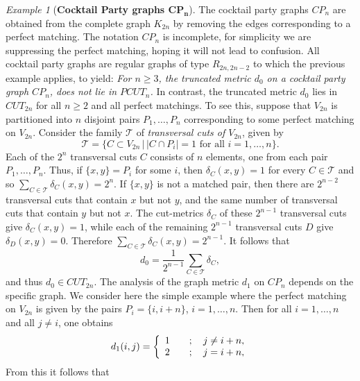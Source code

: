 \documentclass[12pt]{amsart}
\numberwithin{theorem}{section}
\theoremstyle{remark}
\newtheorem{example}[theorem]{Example}
\begin{document}
\begin{example}[{\bf Cocktail Party graphs $\mathbf{CP_n}$}]
The cocktail party graphs $CP_n$ are obtained from the complete graph $K_{2n}$ by removing the edges corresponding to a perfect matching. The notation $CP_n$ is incomplete, for simplicity we are suppressing the perfect matching, hoping it will not lead to confusion. All cocktail party graphs are regular graphs of type $R_{2n,2n-2}$ to which the previous example applies, to yield:
\vskip2mm
 {\em For $n\ge 3$, the truncated metric $d_0$ on a cocktail party graph $CP_n$, does not lie in $PCUT_n$.} 
\vskip2mm
In contrast, the truncated metric $d_0$ lies in $CUT_{2n}$ for all $n\ge 2$ and all perfect matchings. To see this, suppose that $V_{2n}$ is partitioned into $n$ disjoint pairs $P_1, \dots, P_n$ corresponding to some perfect matching on $V_{2n}$. Consider the family $\mathcal T$ of {\em transversal cuts of $V_{2n}$}, given by 
$$\mathcal T = \{C\subset V_{2n}\, |\, |C\cap P_i|=1 \text{ for all } i=1,\dots, n \}.$$ 
Each of the $2^n$ transversal cuts $C$ consists of $n$ elements, one from each pair $P_1, \dots, P_n$. Thus, if $\{x,y\} = P_i$ for some $i$, then $\delta_C (x,y) = 1$ for every $C\in \mathcal T$ and so $\sum_{C\in \mathcal T}\delta_C(x,y) = 2^n$. If $\{x,y\}$ is not a matched pair, then there are $2^{n-2}$ transversal cuts that contain $x$ but not $y$, and the same number of transversal cuts that contain $y$ but not $x$. The cut-metrics $\delta_C$ of these $2^{n-1}$ transversal cuts give $\delta_C(x,y)=1$, while each of the remaining $2^{n-1}$ transversal cuts $D$ give $\delta_D(x,y) = 0$. Therefore $\sum_{C\in \mathcal T}\delta_C(x,y) = 2^{n-1}$. It follows that   
$$ d_0 = \frac{1}{2^{n-1}} \sum _{C\in \mathcal T} \delta_C, $$
and thus $d_0\in CUT_{2n}$. 
\vskip3mm
The analysis of the graph metric $d_1$ on $CP_n$ depends on the specific graph. We consider here the simple example where the perfect matching on $V_{2n}$ is given by the pairs $P_i = \{i,i+n\}$, $i=1,\dots, n$. Then for all $i=1,\dots, n$ and all $j\ne i$, one obtains  
$$d_1(i,j) = \left\{
\begin{array}{cl}   
1 & \quad ; \quad j\ne i+n, \cr 
2 & \quad ; \quad j = i+n,
\end{array}   \right. $$
From this it follows that 
\begin{itemize}

\end{itemize}
\end{example}
\end{document}
